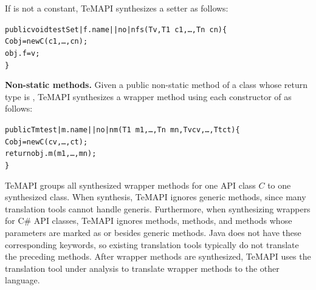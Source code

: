 If  is not a constant, TeMAPI synthesizes a setter as follows:

\begin{CodeOut}%
\begin{alltt}
 public void testSet|f.name||no|nfs(T v, T1\ c1,\ldots, Tn\ cn)\{
   C obj = new C(c1,\ldots, cn);
   obj.f = v;
 \}
\end{alltt}
\end{CodeOut}%

\textbf{Non-static methods.} Given a public non-static method  of a class  whose return type is , TeMAPI synthesizes a wrapper method using each constructor  of  as follows:

\begin{CodeOut}%
\begin{alltt}
 public Tm test|m.name||no|nm(T1\ m1,\ldots, Tn\ mn, Tv cv, \ldots, Tt ct)\{
   C obj = new C(cv,\ldots, ct);
   return obj.m(m1,\ldots, mn);
 \}
\end{alltt}
\end{CodeOut}%


TeMAPI groups all synthesized wrapper methods for one API class $C$ to one synthesized class. When synthesis, TeMAPI ignores generic methods, since many translation tools cannot handle generis. Furthermore, when synthesizing wrappers for C\# API classes, TeMAPI ignores  methods,  methods, and methods whose parameters are marked as  or  besides generic methods. Java does not have these corresponding keywords, so existing translation tools typically do not translate the preceding methods. After wrapper methods are synthesized, TeMAPI uses the translation tool under analysis to translate wrapper methods to the other language.

